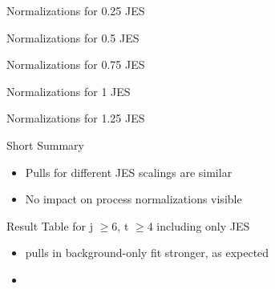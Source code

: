 \begin{frame}{Normalizations for \num{0.25} JES}
\begin{scriptsize}

\end{scriptsize}
\end{frame}

\begin{frame}{Normalizations for \num{0.5} JES}
\begin{scriptsize}

\end{scriptsize}
\end{frame}

\begin{frame}{Normalizations for \num{0.75} JES}
\begin{scriptsize}

\end{scriptsize}
\end{frame}

\begin{frame}{Normalizations for \num{1} JES}
\begin{scriptsize}

\end{scriptsize}
\end{frame}

\begin{frame}{Normalizations for \num{1.25} JES}
\begin{scriptsize}

\end{scriptsize}
\end{frame}

\begin{frame}{Short Summary}
\begin{itemize}
\item Pulls for different JES scalings are similar
\item No impact on process normalizations visible
\end{itemize}
\end{frame}

\begin{frame}{Result Table for j $\geq 6$, t $\geq 4$ including only JES}

\begin{itemize}
\item pulls in background-only fit stronger, as expected
\item %
\end{itemize}
\end{frame}

